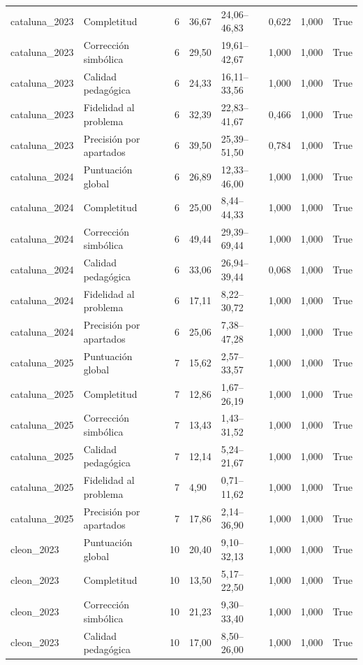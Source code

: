 \begin{tabular}{llrllllr}
cataluna\_2023 & Completitud & 6 & 36,67 & 24,06–46,83 & 0,622 & 1,000 & True \\
cataluna\_2023 & Corrección simbólica & 6 & 29,50 & 19,61–42,67 & 1,000 & 1,000 & True \\
cataluna\_2023 & Calidad pedagógica & 6 & 24,33 & 16,11–33,56 & 1,000 & 1,000 & True \\
cataluna\_2023 & Fidelidad al problema & 6 & 32,39 & 22,83–41,67 & 0,466 & 1,000 & True \\
cataluna\_2023 & Precisión por apartados & 6 & 39,50 & 25,39–51,50 & 0,784 & 1,000 & True \\
cataluna\_2024 & Puntuación global & 6 & 26,89 & 12,33–46,00 & 1,000 & 1,000 & True \\
cataluna\_2024 & Completitud & 6 & 25,00 & 8,44–44,33 & 1,000 & 1,000 & True \\
cataluna\_2024 & Corrección simbólica & 6 & 49,44 & 29,39–69,44 & 1,000 & 1,000 & True \\
cataluna\_2024 & Calidad pedagógica & 6 & 33,06 & 26,94–39,44 & 0,068 & 1,000 & True \\
cataluna\_2024 & Fidelidad al problema & 6 & 17,11 & 8,22–30,72 & 1,000 & 1,000 & True \\
cataluna\_2024 & Precisión por apartados & 6 & 25,06 & 7,38–47,28 & 1,000 & 1,000 & True \\
cataluna\_2025 & Puntuación global & 7 & 15,62 & 2,57–33,57 & 1,000 & 1,000 & True \\
cataluna\_2025 & Completitud & 7 & 12,86 & 1,67–26,19 & 1,000 & 1,000 & True \\
cataluna\_2025 & Corrección simbólica & 7 & 13,43 & 1,43–31,52 & 1,000 & 1,000 & True \\
cataluna\_2025 & Calidad pedagógica & 7 & 12,14 & 5,24–21,67 & 1,000 & 1,000 & True \\
cataluna\_2025 & Fidelidad al problema & 7 & 4,90 & 0,71–11,62 & 1,000 & 1,000 & True \\
cataluna\_2025 & Precisión por apartados & 7 & 17,86 & 2,14–36,90 & 1,000 & 1,000 & True \\
cleon\_2023 & Puntuación global & 10 & 20,40 & 9,10–32,13 & 1,000 & 1,000 & True \\
cleon\_2023 & Completitud & 10 & 13,50 & 5,17–22,50 & 1,000 & 1,000 & True \\
cleon\_2023 & Corrección simbólica & 10 & 21,23 & 9,30–33,40 & 1,000 & 1,000 & True \\
cleon\_2023 & Calidad pedagógica & 10 & 17,00 & 8,50–26,00 & 1,000 & 1,000 & True \\

\end{tabular}
